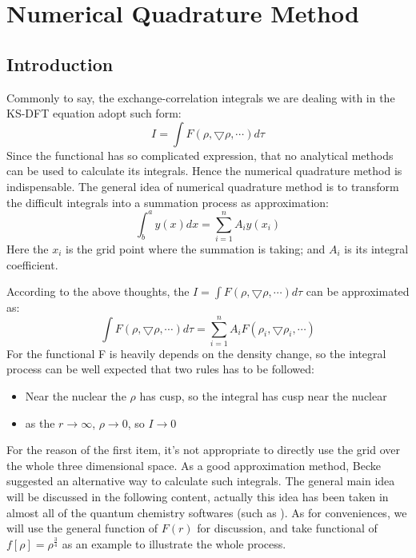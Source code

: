 %
%
%
%

\chapter{Numerical Quadrature Method}


\section{Introduction}
 Commonly to say, the exchange-correlation integrals we
are dealing with in the KS-DFT equation adopt such form:
\begin{equation}\label{}
    I = \int F(\rho, \bigtriangledown \rho, \cdots) d \tau
\end{equation}
Since the functional has so complicated expression, that no
analytical methods can be used to calculate its integrals. Hence the
numerical quadrature method is indispensable. The general idea of
numerical quadrature method is to transform the difficult integrals
into a summation process as approximation:
\begin{equation}\label{}
    \int^{a}_{b}y(x)dx = \sum^{n}_{i=1}A_{i}y(x_{i})
\end{equation}
Here the $x_{i}$ is the grid point where the summation is taking;
and $A_{i}$ is its integral coefficient.

According to the above thoughts, the $I = \int F(\rho,
\bigtriangledown \rho, \cdots) d \tau$ can be approximated as:
\begin{equation}\label{NQMeq:1}
\int F(\rho, \bigtriangledown \rho, \cdots) d \tau =
\sum^{n}_{i=1}A_{i}F(\rho_{i}, \bigtriangledown \rho _{i}, \cdots)
\end{equation}
For the functional F is heavily depends on the density change, so
the integral process can be well expected that two rules has to be
followed:
\begin{itemize}
  \item Near the nuclear the $\rho$ has cusp, so the integral has
  cusp near the nuclear
  \item as the $r \rightarrow \infty$, $\rho \rightarrow 0$, so 
$I \rightarrow 0$
\end{itemize}
For the reason of the first item, it's not appropriate to directly
use the grid over the whole three dimensional space. As a good
approximation method, Becke\cite{Becke} suggested an alternative way
to calculate such integrals. The general main idea will be discussed
in the following content, actually this idea has been taken in
almost all of the quantum chemistry softwares (such as \cite{g03,
QCHEM,turbomole}). As for conveniences, we will use the general
function of $F(r)$ for discussion, and take functional of
$f[\rho]=\rho ^{\frac{3}{4}}$ as an example to illustrate the whole
process.

